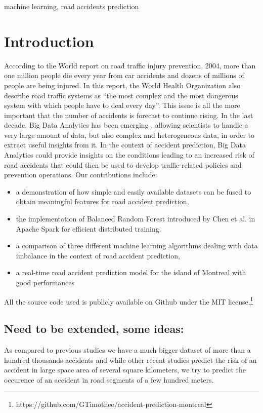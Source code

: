\documentclass[conference]{IEEEtran}
\begin{document}
\begin{IEEEkeywords}
machine learning, road accidents prediction
\end{IEEEkeywords}

\section{Introduction}
According to the World report on road traffic injury prevention, 2004, more than one million people die every year from car accidents and dozens of millions of people are being injured\cite{Peden2004}. In this report, the World Health Organization also describe road traffic systems as “the most complex and the most dangerous system with which people have to deal every day”. This issue is all the more important that the number of accidents is forecast to continue rising. In the last decade, Big Data Analytics has been emerging \cite{Gandomi2015}, allowing scientists to handle a very large amount of data, but also complex and heterogeneous data, in order to extract useful insights from it. In the context of accident prediction, Big Data Analytics could provide insights on the conditions leading to an increased risk of road accidents that could then be used to develop traffic-related policies and prevention operations. Our contributions include: 
\begin{itemize}
\item a demonstration of how simple and easily available datasets can be fused to obtain meaningful features for road accident prediction,
\item the implementation of Balanced Random Forest introduced by Chen et al.\cite{Chen2004} in Apache Spark for efficient distributed training.
\item a comparison of three different machine learning algorithms dealing with data imbalance in the context of road accident prediction,
\item a real-time road accident prediction model for the island of Montreal with good performances
\end{itemize}
All the source code used is publicly available on Github under the MIT license.\footnote{https://github.com/GTimothee/accident-prediction-montreal}

\subsection{Need to be extended, some ideas:}

  As compared to previous studies we have a much bigger dataset of more than a hundred thousands accidents and while other recent studies predict the risk  of an accident in large space area of several square kilometers, we try to predict the occurence of an accident in road segments of a few hundred meters. 
\end{document}
